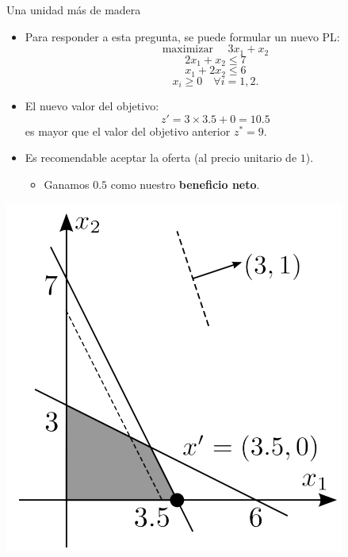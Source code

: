 \documentclass{beamer}
\begin{document}
\begin{frame}{Una unidad más de madera}
\begin{multicols}{2}
    \begin{itemize}
        \item Para responder a esta pregunta, se puede formular un nuevo PL:
        \[
        \text{maximizar } \quad 3x_1 + x_2
        \]
        \[
        2x_1 + x_2 \leq 7
        \]
        \[
        x_1 + 2x_2 \leq 6
        \]
        \[
        x_i \geq 0 \quad \forall i = 1, 2.
        \]
    \end{itemize}
    
    \begin{itemize}
        \item El nuevo valor del objetivo:
        \[
        z' = 3 \times 3.5 + 0 = 10.5
        \]
        es mayor que el valor del objetivo anterior $z^* = 9$.
    \end{itemize}

    \begin{itemize}
        \item Es recomendable aceptar la oferta (al precio unitario de $1$).
        \begin{itemize}
            \item Ganamos $0.5$ como nuestro \textbf{beneficio neto}.
        \end{itemize}
    \end{itemize}
\begin{center}
    \includegraphics[scale=0.5]{images/shadows2.png}
\end{center}
\end{multicols}
\end{frame}
\end{document}

